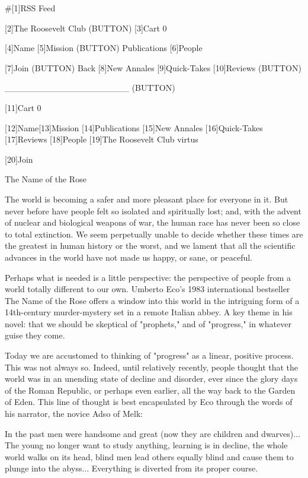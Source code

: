    #[1]RSS Feed

   [2]The Roosevelt Club
   (BUTTON)
   [3]Cart 0

   [4]Name [5]Mission (BUTTON) Publications [6]People

   [7]Join
   (BUTTON) Back [8]New Annales [9]Quick-Takes [10]Reviews
   (BUTTON)

   ____________________ (BUTTON)

   [11]Cart 0

   [12]Name[13]Mission [14]Publications [15]New Annales [16]Quick-Takes
   [17]Reviews [18]People
   [19]The Roosevelt Club
   virtus

   [20]Join

The Name of the Rose


   The world is becoming a safer and more pleasant place for everyone in
   it. But never before have people felt so isolated and spiritually lost;
   and, with the advent of nuclear and biological weapons of war, the
   human race has never been so close to total extinction. We seem
   perpetually unable to decide whether these times are the greatest in
   human history or the worst, and we lament that all the scientific
   advances in the world have not made us happy, or sane, or peaceful.

   Perhaps what is needed is a little perspective: the perspective of
   people from a world totally different to our own. Umberto Eco's 1983
   international bestseller The Name of the Rose offers a window into this
   world in the intriguing form of a 14th-century murder-mystery set in a
   remote Italian abbey. A key theme in his novel: that we should be
   skeptical of "prophets," and of "progress," in whatever guise they
   come.

   Today we are accustomed to thinking of "progress" as a linear, positive
   process. This was not always so. Indeed, until relatively recently,
   people thought that the world was in an unending state of decline and
   disorder, ever since the glory days of the Roman Republic, or perhaps
   even earlier, all the way back to the Garden of Eden. This line of
   thought is best encapsulated by Eco through the words of his narrator,
   the novice Adso of Melk:

     In the past men were handsome and great (now they are children and
     dwarves)... The young no longer want to study anything, learning is
     in decline, the whole world walks on its head, blind men lead others
     equally blind and cause them to plunge into the abyss... Everything
     is diverted from its proper course.

